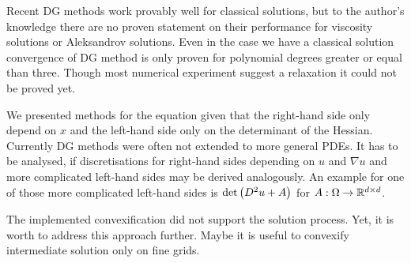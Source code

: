 Recent DG methods work provably well for classical solutions, but to the author's knowledge there are no proven statement on their performance for viscosity solutions or Aleksandrov solutions. Even in the case we have a classical solution convergence of DG method is only proven for polynomial degrees greater or equal than three. Though most numerical experiment suggest a relaxation it could not be proved yet.

We presented methods for the \MA equation given that the right-hand side only depend on $x$ and the left-hand side only on the determinant of the Hessian. Currently DG methods were often not extended to more general PDEs. It has to be analysed, if  discretisations for right-hand sides depending on $u$ and $\nabla u$ and more complicated left-hand sides may be derived analogously. An example for one of those more complicated left-hand sides is $\det{\left(D^2 u +A\right)}$ for $A:\Omega \rightarrow \mathbb{R}^{d \times d}$.
 
The implemented convexification did not support the solution process. Yet, it is worth to address this approach further. Maybe it is useful to convexify intermediate solution only on fine grids.


